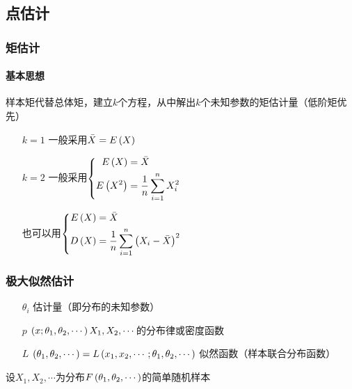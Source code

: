 \documentclass{article}
\begin{document}
\subsection{点估计}


\subsubsection{矩估计}

\paragraph{基本思想}

样本矩代替总体矩，建立$k$个方程，从中解出$k$个未知参数的矩估计量（低阶矩优先）

\begin{enumerate}
    \item [$k=1$] 一般采用$\bar X=E\left(X\right)$
    \item [$k=2$]
          一般采用$\left\{\begin{aligned}
                  E\left(X\right)   & =\bar X              \\
                  E\left(X^2\right) & =\frac1n\sum\limits_{i=1}^n X_i^2 \\
              \end{aligned}\right.$

          也可以用$\left\{\begin{aligned}
                  E\left(X\right) & =\bar X                          \\
                  D\left(X\right) & =\frac1n\sum\limits_{i=1}^n{\left(X_i-\bar X\right)}^2 \\
              \end{aligned}\right.$
\end{enumerate}

\subsubsection{极大似然估计}

\begin{enumerate}
    \item [$\theta_i$] 估计量（即分布的未知参数）
    \item [$p$] $\left(x;\theta_1,\theta_2,\cdots\right)X_1,X_2,\cdots$的分布律或密度函数
    \item [$L$] $\left(\theta_1,\theta_2,\cdots\right)=L\left(x_1,x_2,\cdots;\theta_1,\theta_2,\cdots\right)$ 似然函数（样本联合分布函数）
\end{enumerate}

设$X_1,X_2,\cdots$为分布$F\left(\theta_1,\theta_2,\cdots\right)$的简单随机样本
\end{document}
